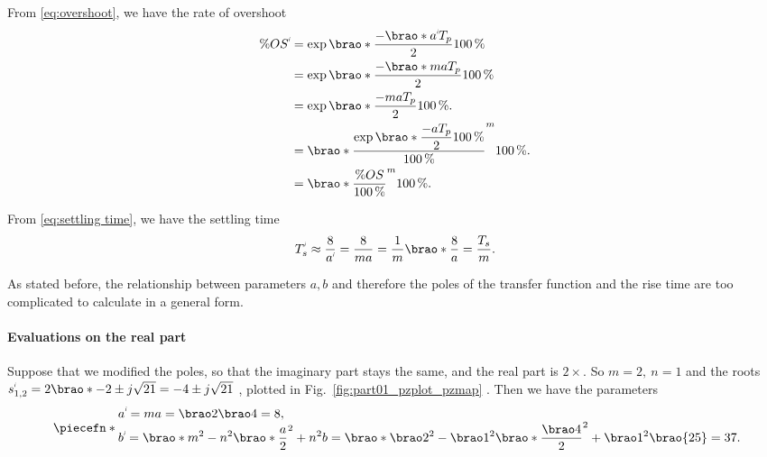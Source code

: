 \documentclass[12pt]{article}
\DeclarePairedDelimiter\brao()%
\DeclarePairedDelimiter\piecefn\{.
\newcommand{\setprime}[2][1]{%
    {#2}^{%
        \raisebox{1pt}{%
            \scalebox{0.5}{%
                \itshape\sffamily\uppercase%
                \expandafter{%
                    \romannumeral#1%
                }%
            }%
        }
    }%
}%
\begin{document}
\begin{enumerate}[(a)]
        From \eqref{eq:overshoot}, we have the rate of overshoot
        \begin{equation}\label{eq:overshoot, m, n}
            \begin{aligned}
                \%\setprime{OS} &{}= \exp\brao*{\dfrac{-\brao*{\setprime{a}}T_p}{2}} \SI{100}\percent
            \\*
                     &{}= \exp\brao*{\dfrac{-\brao*{ma}T_p}{2}} \SI{100}\percent
            \\*
                     &{}= \exp\brao*{\dfrac{-ma T_p}{2}} \SI{100}\percent.
            \\*
                     &{}= \brao*{\frac{\exp\brao*{\dfrac{-a T_p}{2}}\SI{100}\percent}{\SI{100}\percent}}^m \SI{100}\percent.
            \\*
                     &{}= \brao*{\frac{\%OS}{\SI{100}\percent}}^m \SI{100}\percent.
            \\*
            \end{aligned}
        \end{equation}

        From \eqref{eq:settling time}, we have the settling time
        \begin{equation}\label{eq:settling time, m, n}
            \setprime{T}_s \approx \frac8{\setprime{a}} = \frac8{ma} = \frac1m\brao*{\frac8{a}} = \frac{T_s}m.
        \end{equation}

        As stated before, the relationship between parameters $a, b$ and therefore the poles of the transfer function and the rise time are too complicated to calculate in a general form.

        \paragraph{Evaluations on the real part}

        Suppose that we modified the poles, so that the imaginary part stays the same, and the real part is $2\times$.
        So $m = 2,\ n = 1$
        and the roots $\setprime{s}_{1,2} = 2\brao*{-2} \pm j\sqrt{21} = -4 \pm j\sqrt{21}$%
        , plotted in Fig.~\ref{fig:part01_pzplot_pzmap}%
        .
        Then we have the parameters
        \begin{equation}
            \piecefn*{
                \begin{array}{@{}l@{}}\displaystyle
                    \setprime{a} = ma = \brao2\brao4 = 8,
                \\*\displaystyle
                      \setprime{b}
                    = \brao*{m^2 - n^2}\brao*{\frac{a}2}^2 + n^2b
                    = \brao*{\brao2^2 - \brao1^2}\brao*{\frac{\brao4}2}^2 + \brao1^2\brao{25}
                    = 37\rlap.
                \end{array}
            }
        \end{equation}


\end{enumerate}
\end{document}
